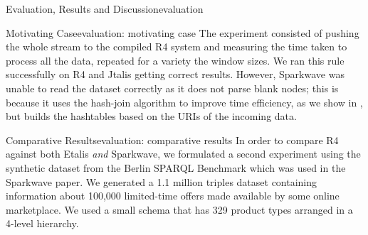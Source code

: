 \begin{nestedsection}{Evaluation, Results and Discussion}{evaluation}
\begin{nestedsection}{Motivating Case}{evaluation: motivating case}
		The experiment consisted of pushing the whole stream to the compiled R4 system and measuring the time taken to process all the data, repeated for a variety the window sizes.
		We ran this rule successfully on R4 and Jtalis getting correct results.
		However, Sparkwave was unable to read the dataset correctly as it does not parse blank nodes;
		this is because it uses the hash-join algorithm to improve time efficiency, as we show in , but builds the hashtables based on the URIs of the incoming data.
	\end{nestedsection}
	\begin{nestedsection}{Comparative Results}{evaluation: comparative results}
		In order to compare R4 against both Etalis \emph{and} Sparkwave, we formulated a second experiment using the synthetic dataset from the Berlin SPARQL Benchmark \citep{BSBMresults} which was used in the Sparkwave paper.
		We generated a 1.1 million triples dataset containing information about 100,000 limited-time offers made available by some online marketplace.
		We used a small schema that has 329 product types arranged in a 4-level hierarchy.


\end{nestedsection}
\end{nestedsection}
